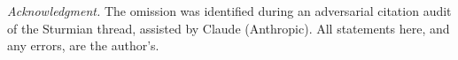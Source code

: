 \documentclass[10pt]{article}
\begin{document}

\medskip\noindent\emph{Acknowledgment.} The omission was identified during an adversarial citation
audit of the Sturmian thread, assisted by Claude (Anthropic). All statements here, and any errors,
are the author's.

\enlargethispage{3\baselineskip}
{\footnotesize


}
\end{document}
